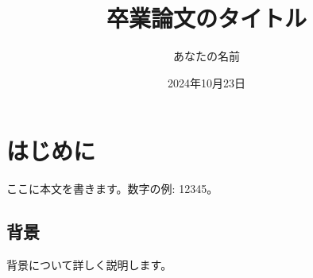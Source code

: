 \documentclass[a4paper, 12pt]{article}
\title{卒業論文のタイトル}
\author{あなたの名前}
\date{2024年10月23日}
\begin{document}
\maketitle

\section{はじめに}
ここに本文を書きます。数字の例: 12345。

\subsection{背景}
背景について詳しく説明します。

\end{document}
